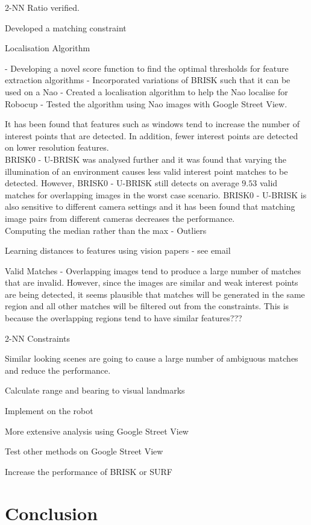 2-NN Ratio verified.

Developed a matching constraint

Localisation Algorithm




 - Developing a novel score function to find the optimal thresholds for feature extraction algorithms
 - Incorporated variations of BRISK such that it can be used on a Nao
 - Created a localisation algorithm to help the Nao localise for Robocup
 - Tested the algorithm using Nao images with Google Street View.



It has been found that features such as windows tend to increase the number of interest points that are detected. In addition, fewer interest points are detected on lower resolution features.\\

BRISK0 - U-BRISK was analysed further and it was found that varying the illumination of an environment causes less valid interest point matches to be detected. However, BRISK0 - U-BRISK still detects on average $9.53$ valid matches for overlapping images in the worst case scenario. BRISK0 - U-BRISK is also sensitive to different camera settings and it has been found that matching image pairs from different cameras decreases the performance.\\

Computing the median rather than the max - Outliers

Learning distances to features using vision papers - see email

Valid Matches - Overlapping images tend to produce a large number of matches that are invalid. However, since the images are similar and weak interest points are being detected, it seems plausible that matches will be generated in the same region and all other matches will be filtered out from the constraints. This is because the overlapping regions tend to have similar features???

2-NN Constraints

Similar looking scenes are going to cause a large number of ambiguous matches and reduce the performance.

Calculate range and bearing to visual landmarks

Implement on the robot

More extensive analysis using Google Street View

Test other methods on Google Street View

Increase the performance of BRISK or SURF



\section{Conclusion}
\label{sec:conclusion}